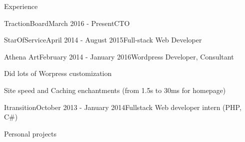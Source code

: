 \documentclass{resume} %
\begin{document}
\begin{rSection}{Experience}
\begin{rSubsection}{TractionBoard}{March 2016 - Present}{CTO}{}
\begin{rSubsection}{StarOfService}{April 2014 - August 2015}{Full-stack Web Developer}{}
%

\end{rSubsection}


\begin{rSubsection}{Athena Art}{February 2014 - January 2016}{Wordpress Developer, Consultant}{}
\item Did lots of Worpress customization
\item Site speed and Caching enchantments (from 1.5s to 30ms for homepage)
%
%

\end{rSubsection}
\clearpage


\begin{rSubsection}{Itransition}{October 2013 - January 2014}{Fullstack Web developer intern (PHP, C\#)}{}
\end{rSubsection}


\begin{rSubsection}{Personal projects}{}{}


\end{rSubsection}
\end{rSubsection}
\end{rSection}
\end{document}
